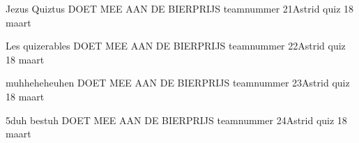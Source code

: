 \documentclass{exam}
\begin{document}
\begin{landscape}
\vspace*{\fill}
\centering\LARGE{Jezus Quiztus\linebreak
DOET MEE AAN DE BIERPRIJS\linebreak
teamnummer 21\linebreak Astrid quiz 18 maart}
\vspace*{\fill}


\newpage

\vspace*{\fill}
\centering\LARGE{Les quizerables\linebreak
DOET MEE AAN DE BIERPRIJS\linebreak
teamnummer 22\linebreak Astrid quiz 18 maart}
\vspace*{\fill}


\newpage

\vspace*{\fill}
\centering\LARGE{muhheheheuhen\linebreak
DOET MEE AAN DE BIERPRIJS\linebreak
teamnummer 23\linebreak Astrid quiz 18 maart}
\vspace*{\fill}


\newpage

\vspace*{\fill}
\centering\LARGE{5duh bestuh\linebreak
DOET MEE AAN DE BIERPRIJS\linebreak
teamnummer 24\linebreak Astrid quiz 18 maart}
\vspace*{\fill}



\end{landscape}
\end{document}
